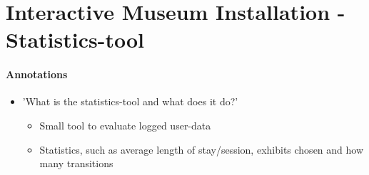 \section{Interactive Museum Installation - Statistics-tool}
\label{implementation_tool}

\paragraph{Annotations}

\begin{itemize}
	\item 'What is the statistics-tool and what does it do?'
	\begin{itemize}
		\item Small tool to evaluate logged user-data
		\item Statistics, such as average length of stay/session, exhibits chosen and how many transitions 
	\end{itemize}
\end{itemize}
